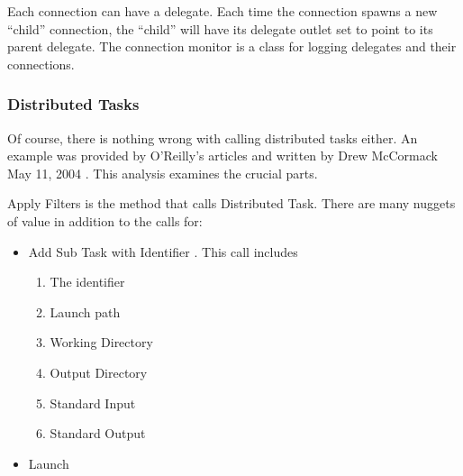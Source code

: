 \documentclass[11pt]{article}
\begin{document}
Each connection can have a delegate.  Each time the connection spawns a new ``child'' connection, the ``child'' will have its delegate outlet set to point to its parent delegate. The connection monitor is a class for logging delegates and their connections.  

\subsubsection {Distributed Tasks}
Of course, there is nothing wrong with calling distributed tasks either.  An example was provided by O'Reilly's articles and written by Drew McCormack May 11, 2004 \cite {mccormack}. This analysis examines the crucial parts.

Apply Filters is the method that calls Distributed Task.  There are many nuggets of value in addition to the calls for:
\begin{itemize}
\item Add Sub Task with Identifier .  This call includes
\begin{enumerate}
\item The identifier
\item Launch path
\item Working Directory
\item Output Directory
\item Standard Input 
\item Standard Output
\end{enumerate}

\item Launch
\end{itemize}
\end{document}
